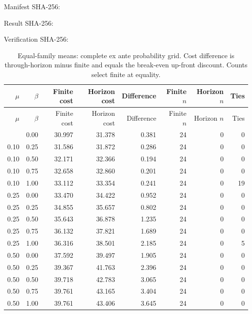 \documentclass[preprint,11pt,authoryear]{elsarticle}
\begin{document}
\noindent Manifest SHA-256:\par\noindent\texttt{}\par
\noindent Result SHA-256:\par\noindent\texttt{}\par
\noindent Verification SHA-256:\par\noindent\texttt{}\par
\clearpage%
\renewcommand{\thetable}{I1}
\begingroup\small\setlength{\tabcolsep}{4pt}\begin{longtable}{rrrrrrrr}
\caption{Equal-family means: complete ex ante probability grid. Cost difference is through-horizon minus finite and equals the break-even up-front discount. Counts select finite at equality.}\\
\toprule $\mu$ & $\beta$ & Finite cost & Horizon cost & Difference & Finite $n$ & Horizon $n$ & Ties\\\midrule
\endfirsthead
\toprule $\mu$ & $\beta$ & Finite cost & Horizon cost & Difference & Finite $n$ & Horizon $n$ & Ties\\\midrule
\endhead\bottomrule\endfoot
0.10 & 0.00 & 30.997 & 31.378 & 0.381 & 24 & 0 & 0\\
0.10 & 0.25 & 31.586 & 31.872 & 0.286 & 24 & 0 & 0\\
0.10 & 0.50 & 32.171 & 32.366 & 0.194 & 24 & 0 & 0\\
0.10 & 0.75 & 32.658 & 32.860 & 0.201 & 24 & 0 & 0\\
0.10 & 1.00 & 33.112 & 33.354 & 0.241 & 24 & 0 & 19\\
0.25 & 0.00 & 33.470 & 34.422 & 0.952 & 24 & 0 & 0\\
0.25 & 0.25 & 34.855 & 35.657 & 0.802 & 24 & 0 & 0\\
0.25 & 0.50 & 35.643 & 36.878 & 1.235 & 24 & 0 & 0\\
0.25 & 0.75 & 36.132 & 37.821 & 1.689 & 24 & 0 & 0\\
0.25 & 1.00 & 36.316 & 38.501 & 2.185 & 24 & 0 & 5\\
0.50 & 0.00 & 37.592 & 39.497 & 1.905 & 24 & 0 & 0\\
0.50 & 0.25 & 39.367 & 41.763 & 2.396 & 24 & 0 & 0\\
0.50 & 0.50 & 39.718 & 42.783 & 3.065 & 24 & 0 & 0\\
0.50 & 0.75 & 39.761 & 43.165 & 3.404 & 24 & 0 & 0\\
0.50 & 1.00 & 39.761 & 43.406 & 3.645 & 24 & 0 & 0\\

\end{longtable}
\end{document}
